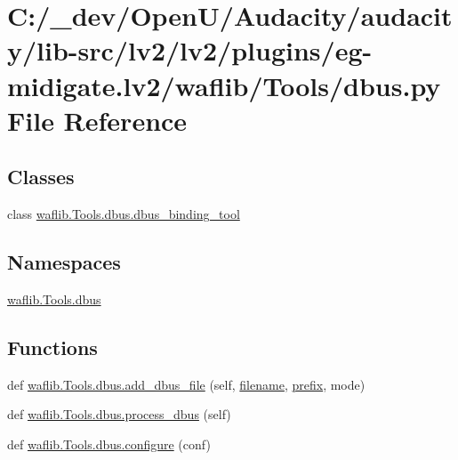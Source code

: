 \hypertarget{lv2_2plugins_2eg-midigate_8lv2_2waflib_2_tools_2dbus_8py}{}\section{C\+:/\+\_\+dev/\+Open\+U/\+Audacity/audacity/lib-\/src/lv2/lv2/plugins/eg-\/midigate.lv2/waflib/\+Tools/dbus.py File Reference}
\label{lv2_2plugins_2eg-midigate_8lv2_2waflib_2_tools_2dbus_8py}
\subsection*{Classes}
\begin{DoxyCompactItemize}
\item 
class \hyperlink{classwaflib_1_1_tools_1_1dbus_1_1dbus__binding__tool}{waflib.\+Tools.\+dbus.\+dbus\+\_\+binding\+\_\+tool}
\end{DoxyCompactItemize}
\subsection*{Namespaces}
\begin{DoxyCompactItemize}
\item 
 \hyperlink{namespacewaflib_1_1_tools_1_1dbus}{waflib.\+Tools.\+dbus}
\end{DoxyCompactItemize}
\subsection*{Functions}
\begin{DoxyCompactItemize}
\item 
def \hyperlink{namespacewaflib_1_1_tools_1_1dbus_a6984c3a3293d830848a5b9e06326a353}{waflib.\+Tools.\+dbus.\+add\+\_\+dbus\+\_\+file} (self, \hyperlink{test__portburn_8cpp_a7efa5e9c7494c7d4586359300221aa5d}{filename}, \hyperlink{structprefix}{prefix}, mode)
\item 
def \hyperlink{namespacewaflib_1_1_tools_1_1dbus_a75dbed39a93f5b22ad67c948e91f2008}{waflib.\+Tools.\+dbus.\+process\+\_\+dbus} (self)
\item 
def \hyperlink{namespacewaflib_1_1_tools_1_1dbus_abce63288e0395b45e8006bd6cc81edb7}{waflib.\+Tools.\+dbus.\+configure} (conf)
\end{DoxyCompactItemize}
